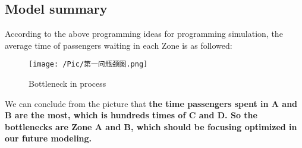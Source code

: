 \subsection{Model summary}
According to the above programming ideas for programming simulation, the average time of passengers waiting in each Zone is as followed:

\begin{figure}[H]
\centering
\texttt{[image: /Pic/第一问瓶颈图.png]}
\caption{Bottleneck in process}\label{fig:bottleneck}
\end{figure}

We can conclude from the picture that \textbf{the time passengers spent in A and B are the most, which is hundreds times of C and D. So the bottlenecks are Zone A and B, which should be focusing optimized in our future modeling.}









